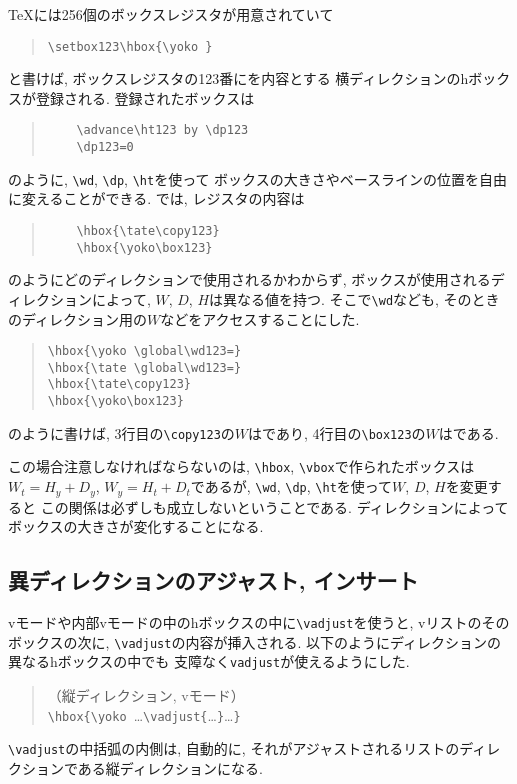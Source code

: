\TeX には256個のボックスレジスタが用意されていて
\begin{quote}
	\verb|\setbox123\hbox{\yoko |\verb|}|
\end{quote}
と書けば, ボックスレジスタの123番にを内容とする
横ディレクションのhボックスが登録される.
登録されたボックスは
\begin{quote} \begin{verbatim}
	\advance\ht123 by \dp123
	\dp123=0
\end{verbatim} \end{quote}
のように, \verb|\wd|, \verb|\dp|, \verb|\ht|を使って
ボックスの大きさやベースラインの位置を自由に変えることができる.
\pTeX では, レジスタの内容は
\begin{quote} \begin{verbatim}
	\hbox{\tate\copy123}
	\hbox{\yoko\box123}
\end{verbatim} \end{quote}
のようにどのディレクションで使用されるかわからず,
ボックスが使用されるディレクションによって, $W$, $D$, $H$は異なる値を持つ.
そこで\verb|\wd|なども,
そのときのディレクション用の$W$などをアクセスすることにした.
\begin{quote}
	\verb|\hbox{\yoko \global\wd123=|\verb|}|\\
	\verb|\hbox{\tate \global\wd123=|\verb|}|\\
	\verb|\hbox{\tate\copy123}|\\
	\verb|\hbox{\yoko\box123}|
\end{quote}
のように書けば, 3行目の\verb|\copy123|の$W$はであり,
4行目の\verb|\box123|の$W$はである.

この場合注意しなければならないのは,
\verb|\hbox|, \verb|\vbox|で作られたボックスは
$W_t=H_y+D_y$, $W_y=H_t+D_t$であるが,
\verb|\wd|, \verb|\dp|, \verb|\ht|を使って$W$, $D$, $H$を変更すると
この関係は必ずしも成立しないということである.
ディレクションによってボックスの大きさが変化することになる.

\subsection{異ディレクションのアジャスト, インサート}

vモードや内部vモードの中のhボックスの中に\verb|\vadjust|を使うと,
vリストのそのボックスの次に, \verb|\vadjust|の内容が挿入される.
以下のようにディレクションの異なるhボックスの中でも
支障なく\verb|vadjust|が使えるようにした.
\begin{quote}
	（縦ディレクション, vモード）\\
	\verb|\hbox{\yoko |\ldots\verb|\vadjust{|\ldots\verb|}|\ldots\verb|}|
\end{quote}
\verb|\vadjust|の中括弧の内側は, 自動的に,
それがアジャストされるリストのディレクションである縦ディレクションになる.


